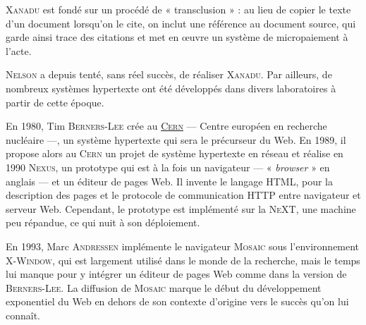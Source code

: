 \textsc{Xanadu} est fondé sur un procédé de « transclusion » : au lieu de copier le texte d'un document lorsqu'on le cite, on inclut une référence au document source, qui garde ainsi trace des citations et met en œuvre un système de micropaiement à l’acte.

\textsc{Nelson} a depuis tenté, sans réel succès, de réaliser \textsc{Xanadu}. Par ailleurs, de nombreux systèmes hypertexte ont été développés dans divers laboratoires à partir de cette époque.

En 1980, Tim \textsc{Berners-Lee} crée au \href{https://home.cern/}{\textsc{Cern}} --- Centre européen en recherche nucléaire ---, un système hypertexte qui sera le précurseur du Web. 
En 1989, il propose alors au \textsc{Cern} un projet de système hypertexte en réseau et réalise en 1990 \textsc{Nexus}, un prototype qui est à la fois un navigateur --- « \textit{browser} » en anglais --- et un éditeur de pages Web. Il invente le langage \textsc{HTML}, pour la description des pages et le protocole de communication \textsc{HTTP} entre navigateur et serveur Web. Cependant, le prototype est implémenté sur la \textsc{NeXT}, une machine peu répandue, ce qui nuit à son déploiement.


En 1993, Marc \textsc{Andressen} implémente le navigateur \textsc{Mosaic} sous l'environnement \textsc{X-Window}, qui est largement utilisé dans le monde de la recherche, mais le temps lui manque pour y intégrer un éditeur de pages Web comme dans la version de \textsc{Berners-Lee}. La diffusion de \textsc{Mosaic} marque le début du développement exponentiel du Web en dehors de son contexte d'origine vers le succès qu'on lui connaît.

